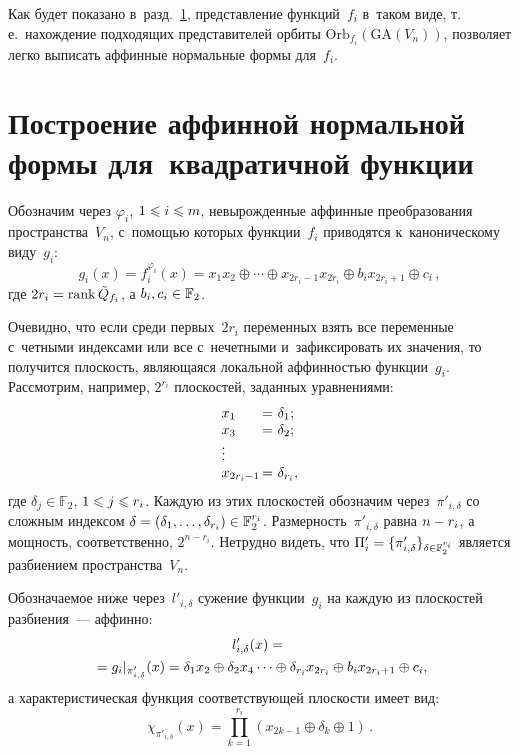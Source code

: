 \begin{multicols}{2}
Как будет показано в~разд.~\ref{canonic-to-ANF}, представление функций~$f_i$ 
в~таком виде, т.\,е.\ нахождение подходящих представителей орбиты 
$\mathrm{Orb}_{f_i}(\mathrm{GA}(V_n))$, позволяет легко выписать аффинные 
нормальные формы для~$f_i$.

\section{Построение аффинной нормальной формы для~квадратичной 
функции}\label{canonic-to-ANF}

Обозначим через $\varphi_i$, $1\hm\leqslant i\hm\leqslant m$, невырожденные аффинные преобразования 
пространства~$V_n$, с~помощью которых функции~$f_i$ приводятся к~каноническому 
виду~$g_i$:
$$
g_i(x)=f_i^{\varphi_i}(x)=x_1x_2\oplus\cdots\oplus x_{2r_i-1}x_{2r_i}\oplus 
b_ix_{2r_i+1}\oplus c_i\,,
$$
где $2r_i=\mathrm{rank}\, \tilde{Q}_{f_i}$, а $b_i, c_i\hm\in \mathbb{F}_2$.

Очевидно, что если среди первых~$2r_i$ переменных взять все переменные с~четными 
индексами или все с~нечетными и~зафиксировать их значения, то получится 
плоскость, являющаяся локальной аффинностью функции~$g_i$.
Рассмотрим, например, $2^{r_i}$ плоскостей, заданных уравнениями:
$$    \begin{array}{l@{\,}c@{\ }l}
        x_1&=&\delta_1;\\
        x_3&=&\delta_2;\\
        \vdots\\
        x_{2r_i-1}&=&\delta_{r_i},\\
    \end{array}
$$
где $\delta_j\in\mathbb{F}_2$, $1\hm\leqslant j\hm\leqslant r_i$.
Каждую из этих плоскостей обозначим через~$\pi'_{i,\delta}$ со сложным индексом 
$\delta\hm=(\delta_1,\dots,\delta_{r_i})\in\mathbb{F}_2^{r_i}$.
Размерность~$\pi'_{i,\delta}$ равна $n\hm-r_i$, а мощность, соответственно, 
$2^{n-r_i}$.
Нетрудно видеть, что $\Pi'_i\hm=\{\pi'_{i,\delta}\}_{\delta\in\mathbb{F}_2^{r_i}}$ 
является разбиением пространства~$V_n$.

Обозначаемое ниже через~$l'_{i,\delta}$ сужение функции~$g_i$ на каждую из 
плоскостей разбиения~--- аффинно:
\begin{multline*}
l'_{i,\delta}(x)={}\\
{}=g_i|_{\pi'_{i,\delta}}(x)=\delta_1x_2\oplus\delta_2x_4\cdots\oplus\delta_{r_i}x_{2r_i}\oplus b_ix_{2r_i+1}\oplus c_i,
\hspace*{-0.80452pt}
\end{multline*}
а характеристическая функция соответствующей плоскости имеет вид:
$$
\chi_{\pi'_{i,\delta}}(x)=\prod\limits_{k=1}^{r_i}\left(x_{2k-1}\oplus\delta_k\oplus1\right)\,.
$$


\end{multicols}
